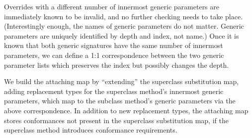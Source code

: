 \documentclass[a4paper,headsepline,bibliography=totoc,toc=flat,fleqn,twoside=semi]{scrbook}
\theoremstyle{definition}
\theoremstyle{definition}
\theoremstyle{definition}
\begin{document}
Overrides with a different number of innermost generic parameters are immediately known to be invalid, and no further checking needs to take place. (Interestingly enough, the names of generic parameters do not matter. Generic parameters are uniquely identified by depth and index, not name.) Once it is known that both generic signatures have the same number of innermost parameters, we can define a 1:1 correspondence between the two generic parameter lists which preserves the index but possibly changes the depth.

We build the attaching map by ``extending'' the superclass substitution map, adding replacement types for the superclass method's innermost generic parameters, which map to the subclass method's generic parameters via the above correspondence. In addition to new replacement types, the attaching map stores conformances not present in the superclass substitution map, if the superclass method introduces conformance requirements.
\end{document}
